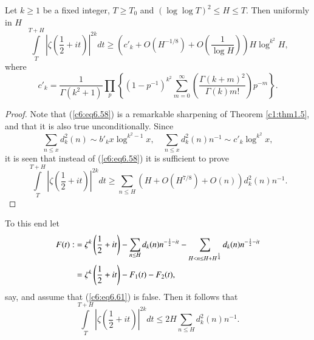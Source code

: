 \begin{thm}\label{c6:thm6.5}
Let $k \geq 1$ be a fixed integer, $T \geq T_0$ and $(\log \log T)^2
\leq H \leq T$. Then uniformly in $H$ 
\begin{equation}
\int\limits^{T+H}_T \left|\zeta \left(\frac{1}{2} + it \right)
\right|^{2k} dt \geq \left(c'_k + O (H^{-1/8}) + O \left(\frac{1}{\log H} \right)
\right) H \log^{k^2} H, \label{c6:eq6.58} 
\end{equation}
where 
\begin{equation}
c'_k = \frac{1}{\Gamma (k^2 + 1)} \prod\limits_p \left\{
\left(1-p^{-1}\right)^{k^2} \sum\limits^\infty_{m=0} \left(\frac{\Gamma
  (k+m)^2}{\Gamma(k) m!}\right) p^{-m}\right\}.   
\label{c6:eq6.59}
\end{equation}
\end{thm}

\begin{proof}
Note that (\ref{c6:eq6.58}) is a remarkable sharpening of Theorem
\ref{c1:thm1.5}, and that it is also true unconditionally. Since 
\begin{equation}
\sum\limits_{n \leq x} d^2_k(n) \sim b'_k x \log^{k^2-1} x,\quad
\sum\limits_{n\leq x} d^2_k (n) n^{-1} \sim c'_k \log^{k^2} x,
\label{c6:eq6.60} 
\end{equation}
it is seen that instead of (\ref{c6:eq6.58}) it is sufficient to prove 
\begin{equation}
\int\limits^{T+H}_T \left|\zeta \left(\frac{1}{2} + it
\right)\right|^{2k} dt \geq \sum\limits_{n \leq H} \left(H+ O(H^{7/8})
+ O(n)\right) d^2_k (n) n^{-1}. \label{c6:eq6.61} 
\end{equation}
\end{proof}

To this end let\pageoriginale
\begin{align}
F(t) : & = \zeta^k \left(\frac{1}{2} + it \right) - \sum\limits_{n
  \leq H} d_k(n) n^{-\frac{1}{2}-it} - \sum\limits_{H < n \leq H +
  H^{\frac{1}{4}}} d_k(n) n^{-\frac{1}{2} -it}\label{c6:eq6.62}\\ 
& = \zeta^k \left(\frac{1}{2}+it \right) - F_1(t) - F_2(t),\notag 
\end{align}
say, and assume that (\ref{c6:eq6.61}) is false. Then it follows that 
\begin{equation}
\int\limits^{T+H}_T \left|\zeta \left(\frac{1}{2} + it
\right)\right|^{2k} dt \leq 2H \sum\limits_{n \leq H} d^2_k(n)
n^{-1}.\label{c6:eq6.63} 
\end{equation}

